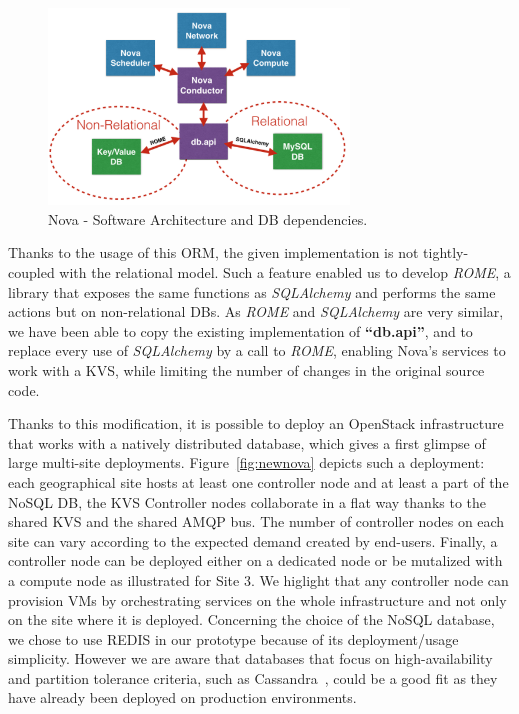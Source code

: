 \begin{figure}[htbp]
        \centering
        \includegraphics[width=8cm]{figures/rome_nova.png}
        \caption{Nova - Software Architecture and DB dependencies.}
        \label{fig:nova_dbs}
\end{figure}

Thanks to the usage of this ORM, the given implementation is not tightly-coupled with the relational model. Such a feature enabled us to develop
\textit{ROME}, a library that exposes the same functions as \textit{SQLAlchemy} and performs the same actions but on non-relational DBs. As
\textit{ROME} and \textit{SQLAlchemy} are very similar, we have been able to copy the existing implementation of \textbf{``db.api''}, and to replace
every use of \textit{SQLAlchemy} by a call to \textit{ROME}, enabling Nova's services to work with a KVS, while limiting the number of changes in the
original source code.

Thanks to this modification, it is possible to deploy an OpenStack infrastructure that works with a natively distributed database, which gives a first
glimpse of large multi-site deployments. Figure~\ref{fig:newnova} depicts such a deployment:
each geographical site hosts at least one controller node and at least a part of the NoSQL DB, \aka the KVS Controller nodes collaborate in a flat way
thanks to the shared KVS and the shared AMQP bus. The number of controller nodes on each site can vary according to the expected demand created by
end-users. Finally, a controller node can be deployed either on a dedicated node or be mutalized with a compute node as illustrated for Site 3. We
higlight that any controller node can provision VMs by orchestrating services on the whole infrastructure and not only on the site where it is
deployed. Concerning the choice of the NoSQL database, we chose to use REDIS in our prototype because of its deployment/usage simplicity. However we
are aware that databases that focus on high-availability and partition tolerance criteria, such as Cassandra~\cite{lakshman:2010}, could be a good fit
as they have already been deployed on production environments.

